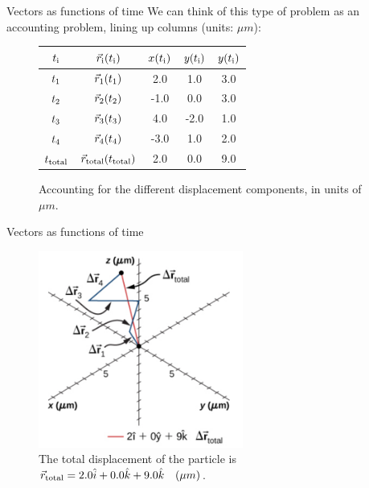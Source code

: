 \documentclass{beamer}
\begin{document}
\begin{frame}{Vectors as functions of time}
We can think of this type of problem as an accounting problem, lining up columns (units: $\mu m$):
\begin{figure}
\begin{tabular}{| c | c | c | c | c |}
\hline
$t_{\rm i}$ & $\vec{r}_{\rm i}(t_{\rm i})$ & $x(t_{\rm i})$ & $y(t_{\rm i})$ & $y(t_{\rm i})$ \\
\hline
$t_{\rm 1}$ & $\vec{r}_{\rm 1}(t_{\rm 1})$ & 2.0 & 1.0 & 3.0 \\
\hline
$t_{\rm 2}$ & $\vec{r}_{\rm 2}(t_{\rm 2})$ & -1.0 & 0.0 & 3.0 \\
\hline
$t_{\rm 3}$ & $\vec{r}_{\rm 3}(t_{\rm 3})$ & 4.0 & -2.0 & 1.0 \\
\hline
$t_{\rm 4}$ & $\vec{r}_{\rm 4}(t_{\rm 4})$ & -3.0 & 1.0 & 2.0 \\
\hline
\hline
$t_{\rm total}$ & $\vec{r}_{\rm total}(t_{\rm total})$ & 2.0 & 0.0 & 9.0 \\
\hline
\end{tabular}
\caption{\label{tab:account} Accounting for the different displacement components, in units of $\mu m$.}
\end{figure}
\end{frame}

\begin{frame}{Vectors as functions of time}
\begin{figure}
\centering
\includegraphics[width=0.6\textwidth]{figures/Brownian.png}
\caption{\label{fig:brown2} The total displacement of the particle is $\vec{r}_{\rm total} = 2.0\hat{i} + 0.0\hat{k} + 9.0\hat{k}\quad (\mu m)$.}
\end{figure}
\end{frame}
\end{document}
